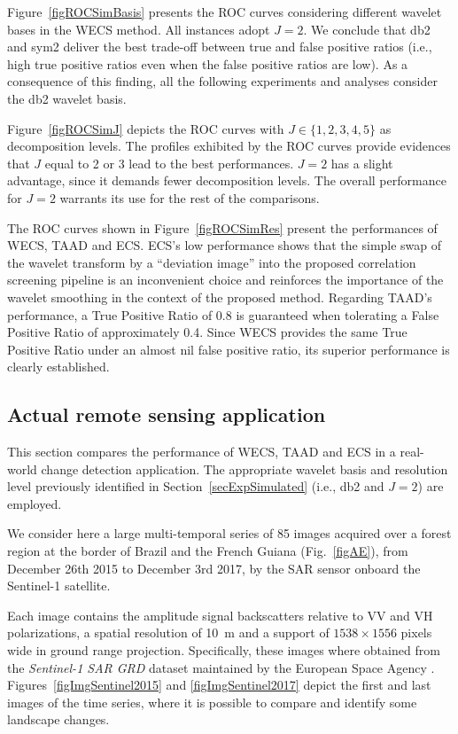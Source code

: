 \documentclass[journal]{IEEEtran}
\begin{document}
Figure~\ref{figROCSimBasis} presents the ROC curves considering different wavelet bases in the WECS method. All instances adopt $J=2$. We conclude that db2 and sym2 deliver the best trade-off between true and false positive ratios (i.e., high true positive ratios even when the false positive ratios are low).
As a consequence of this finding, all the following experiments and analyses consider the db2 wavelet basis.

Figure~\ref{figROCSimJ} depicts the ROC curves with $J \in \{1,2,3,4,5\}$ as decomposition levels. The profiles exhibited by the ROC curves provide evidences that $J$ equal to 2 or 3 lead to the best performances.  $J=2$ has a slight advantage, since it demands fewer decomposition levels. The overall performance for $J=2$ warrants its use for the rest of the comparisons.

The ROC curves shown in Figure~\ref{figROCSimRes} present the performances of WECS, TAAD and ECS. 
ECS's low performance shows that the simple swap of the wavelet transform by a ``deviation image'' into the proposed correlation screening pipeline is an inconvenient choice and reinforces the importance of the wavelet smoothing in the context of the proposed method.
Regarding TAAD's performance, a True Positive Ratio of 0.8 is guaranteed when tolerating a False Positive Ratio of approximately 0.4. 
Since WECS provides the same True Positive Ratio under an almost nil false positive ratio, its superior performance is clearly established.


\subsection{Actual remote sensing application}\label{secExpActual}


This section compares the performance of WECS, TAAD and ECS in a real-world change detection application. The appropriate wavelet basis and resolution level previously identified in Section~\ref{secExpSimulated} (i.e., db2 and $J=2$) are employed.

We consider here a large multi-temporal series of 85 images acquired over a forest region at the border of Brazil and the French Guiana (Fig.~\ref{figAE}), from December 26th 2015 to December 3rd 2017, by the SAR sensor onboard the Sentinel-1 satellite.


Each image contains the amplitude signal backscatters relative to VV and VH polarizations, a spatial resolution of \SI{10}{\meter} and a support of $1538 \times 1556$ pixels wide in ground range projection. 
Specifically, these images where obtained from the \textit{Sentinel-1 SAR GRD} dataset maintained by the European Space Agency \cite{ESA2021}.
%
Figures~\ref{figImgSentinel2015} and \ref{figImgSentinel2017} depict the first and last images of the time series, where it is possible to compare and identify some landscape changes.
\end{document}
